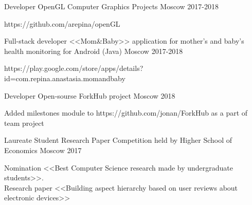 


\begin{cventries}
	

\cventry
{Developer} %
{OpenGL Computer Graphics Projects} %
{Moscow} %
{2017-2018} %
{ %
	\begin{cvitems}
		\item {https://github.com/arepina/openGL}
	\end{cvitems}
}
\noindent	
		
	
\cventry
{Full-stack developer} %
{<<Mom\&Baby>> application for mother's and baby's health monitoring for Android  (Java) } %
{Moscow} %
{2017-2018} %
{ %
	\begin{cvitems}
		\item {https://play.google.com/store/apps/details?id=com.repina.anastasia.momandbaby}
	\end{cvitems}
}
\noindent
	

\cventry
{Developer} %
{Open-sourse ForkHub project} %
{Moscow} %
{2018} %
{ %
	\begin{cvitems}
		\item {Added milestones module to https://github.com/jonan/ForkHub as a part of team project}
	\end{cvitems}
}	
\noindent

\cventry
{Laureate} %
{Student Research Paper Competition held by Higher School of Economics} %
{Moscow} %
{2017} %
{ %
	\begin{cvitems}
		\item {Nomination <<Best Computer Science research made by undergraduate students>>. 
			\\ Research paper <<Building aspect hierarchy based on user reviews about electronic devices>>}
	\end{cvitems}
}
\noindent


\end{cventries}
